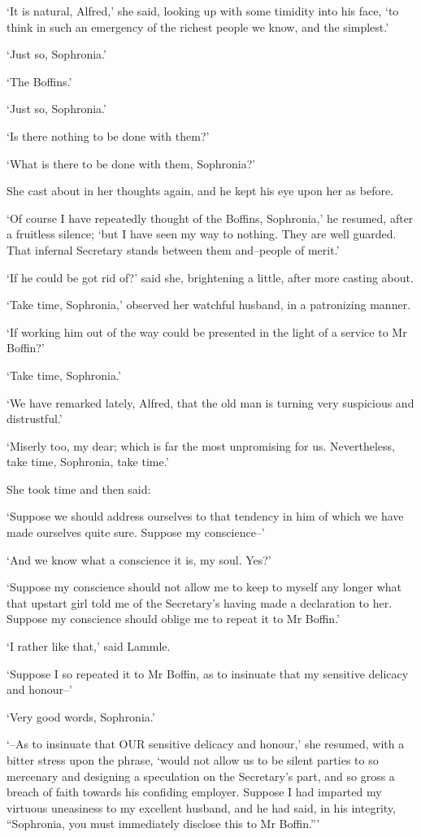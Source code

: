 ‘It is natural, Alfred,’ she said, looking up with some timidity into
his face, ‘to think in such an emergency of the richest people we know,
and the simplest.’

‘Just so, Sophronia.’

‘The Boffins.’

‘Just so, Sophronia.’

‘Is there nothing to be done with them?’

‘What is there to be done with them, Sophronia?’

She cast about in her thoughts again, and he kept his eye upon her as
before.

‘Of course I have repeatedly thought of the Boffins, Sophronia,’ he
resumed, after a fruitless silence; ‘but I have seen my way to nothing.
They are well guarded. That infernal Secretary stands between them
and--people of merit.’

‘If he could be got rid of?’ said she, brightening a little, after more
casting about.

‘Take time, Sophronia,’ observed her watchful husband, in a patronizing
manner.

‘If working him out of the way could be presented in the light of a
service to Mr Boffin?’

‘Take time, Sophronia.’

‘We have remarked lately, Alfred, that the old man is turning very
suspicious and distrustful.’

‘Miserly too, my dear; which is far the most unpromising for us.
Nevertheless, take time, Sophronia, take time.’

She took time and then said:

‘Suppose we should address ourselves to that tendency in him of which we
have made ourselves quite sure. Suppose my conscience--’

‘And we know what a conscience it is, my soul. Yes?’

‘Suppose my conscience should not allow me to keep to myself any
longer what that upstart girl told me of the Secretary’s having made a
declaration to her. Suppose my conscience should oblige me to repeat it
to Mr Boffin.’

‘I rather like that,’ said Lammle.

‘Suppose I so repeated it to Mr Boffin, as to insinuate that my
sensitive delicacy and honour--’

‘Very good words, Sophronia.’

‘--As to insinuate that OUR sensitive delicacy and honour,’ she resumed,
with a bitter stress upon the phrase, ‘would not allow us to be silent
parties to so mercenary and designing a speculation on the Secretary’s
part, and so gross a breach of faith towards his confiding employer.
Suppose I had imparted my virtuous uneasiness to my excellent husband,
and he had said, in his integrity, “Sophronia, you must immediately
disclose this to Mr Boffin.”’

